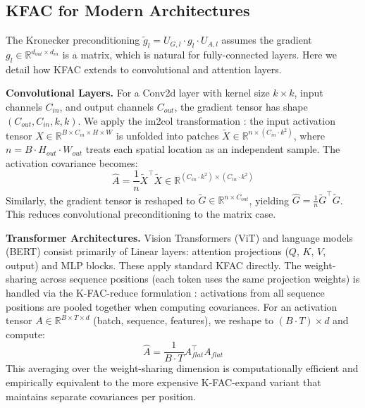 \documentclass{article}
\theoremstyle{plain}
\theoremstyle{definition}
\theoremstyle{remark}
\begin{document}
\subsection{KFAC for Modern Architectures}
\label{app:kfac_architectures}

The Kronecker preconditioning $\tilde{g}_l = U_{G,l} \cdot g_l \cdot U_{A,l}$ assumes the gradient $g_l \in \mathbb{R}^{d_{out} \times d_{in}}$ is a matrix, which is natural for fully-connected layers. Here we detail how KFAC extends to convolutional and attention layers.

\textbf{Convolutional Layers.} For a Conv2d layer with kernel size $k \times k$, input channels $C_{in}$, and output channels $C_{out}$, the gradient tensor has shape $(C_{out}, C_{in}, k, k)$. We apply the im2col transformation \cite{DBLP:journals/corr/MartensG15}: the input activation tensor $X \in \mathbb{R}^{B \times C_{in} \times H \times W}$ is unfolded into patches $\tilde{X} \in \mathbb{R}^{n \times (C_{in} \cdot k^2)}$, where $n = B \cdot H_{out} \cdot W_{out}$ treats each spatial location as an independent sample. The activation covariance becomes:
\begin{equation}
    \hat{A} = \frac{1}{n} \tilde{X}^\top \tilde{X} \in \mathbb{R}^{(C_{in} \cdot k^2) \times (C_{in} \cdot k^2)}
\end{equation}
Similarly, the gradient tensor is reshaped to $\tilde{G} \in \mathbb{R}^{n \times C_{out}}$, yielding $\hat{G} = \frac{1}{n}\tilde{G}^\top \tilde{G}$. This reduces convolutional preconditioning to the matrix case.

\textbf{Transformer Architectures.} Vision Transformers (ViT) and language models (BERT) consist primarily of Linear layers: attention projections ($Q$, $K$, $V$, output) and MLP blocks. These apply standard KFAC directly. The weight-sharing across sequence positions (each token uses the same projection weights) is handled via the K-FAC-reduce formulation \cite{eschenhagen2023kfac}: activations from all sequence positions are pooled together when computing covariances. For an activation tensor $A \in \mathbb{R}^{B \times T \times d}$ (batch, sequence, features), we reshape to $(B \cdot T) \times d$ and compute:
\begin{equation}
    \hat{A} = \frac{1}{B \cdot T} A_{flat}^\top A_{flat}
\end{equation}
This averaging over the weight-sharing dimension is computationally efficient and empirically equivalent to the more expensive K-FAC-expand variant that maintains separate covariances per position.
\end{document}
